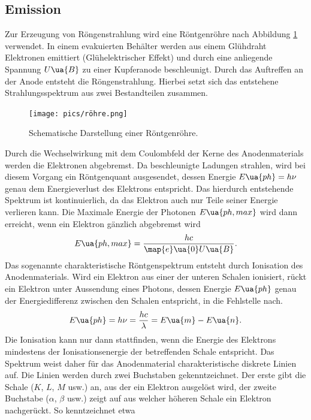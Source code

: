 \subsection{Emission}
Zur Erzeugung von Röngenstrahlung wird eine Röntgenröhre nach Abbildung \ref{fig: röhre} verwendet. In einem
evakuierten Behälter werden aus einem Glühdraht Elektronen emittiert (Glühelektrischer Effekt) und durch eine
anliegende Spannung $U\ua{B}$ zu einer Kupferanode beschleunigt. Durch das Auftreffen an der Anode
entsteht die Röngenstrahlung. Hierbei setzt sich das entstehene Strahlungsspektrum aus zwei
Bestandteilen zusammen.\\
\begin{figure}
  \centering
  \texttt{[image: pics/röhre.png]}
  \caption{Schematische Darstellung einer Röntgenröhre\cite{anleitung602i}.}
  \label{fig: röhre}
\end{figure}
Durch die Wechselwirkung mit dem Coulombfeld der Kerne des Anodenmaterials werden die Elektronen abgebremst. Da beschleunigte Ladungen strahlen,
wird bei diesem
Vorgang ein Röntgenquant ausgesendet, dessen Energie $E\ua{ph} = h\nu$ genau dem Energieverlust des Elektrons
entspricht. Das hierdurch entstehende Spektrum ist kontinuierlich, da das Elektron auch nur Teile seiner
Energie verlieren kann. Die Maximale Energie der Photonen $E\ua{ph, max}$ wird dann erreicht,
wenn ein Elektron gänzlich abgebremst wird
\begin{equation}
  E\ua{ph, max} = \frac{h c}{\map{e}\ua{0}U\ua{B}}.
  \label{eq: E_max}
\end{equation}
Das sogenannte charakteristische Röntgenspektrum entsteht durch Ionisation des Anodenmaterials.
Wird ein Elektron aus einer der unteren Schalen ionisiert, rückt ein Elektron unter Aussendung eines
Photons, dessen Energie $E\ua{ph}$ genau der Energiedifferenz zwischen den Schalen entspricht, in die Fehlstelle nach.
\begin{equation}
  E\ua{ph} = h\nu = \frac{h c}{\lambda} = E\ua{m} - E\ua{n}.
  \label{eq: photonenenergie}
\end{equation}
Die Ionisation kann nur dann stattfinden, wenn die Energie des Elektrons mindestens der Ionisationsenergie der betreffenden Schale entspricht.
Das Spektrum weist daher für das Anodenmaterial charakteristische diskrete Linien auf. Die Linien werden durch zwei Buchstaben
gekenntzeichnet. Der erste gibt die Schale ($K$, $L$, $M$ usw.) an, aus der ein Elektron ausgelöst wird, der zweite Buchstabe
($\alpha$, $\beta$ usw.) zeigt auf aus welcher höheren Schale ein Elektron nachgerückt. So kenntzeichnet etwa
